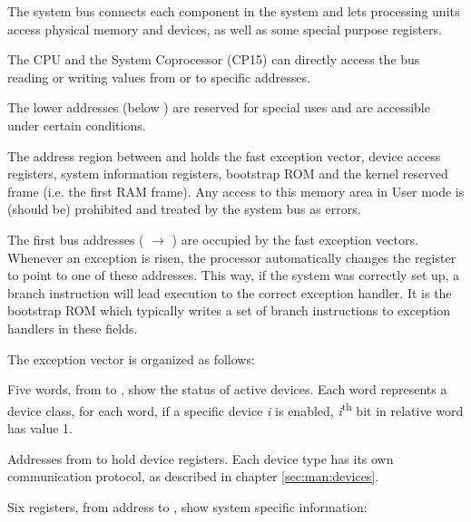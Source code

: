 
The system bus connects each component in the system and lets processing units access physical memory and devices, as well as some special purpose registers.

The CPU and the System Coprocessor (CP15) can directly access the bus reading or writing values from or to specific addresses.

The lower addresses (below ) are reserved for special uses and are accessible under certain conditions.

\label{sec:man:reservedAddressSpace}
The address region between  and  holds the fast exception vector, device access registers, system information registers, bootstrap ROM and the kernel reserved frame (i.e. the first RAM frame). Any access to this memory area in User mode is (should be) prohibited and treated by the system bus as errors.


\label{sec:man:exceptionVector}
The first bus addresses ( $\rightarrow$ ) are occupied by the fast exception vectors.
Whenever an exception is risen, the processor automatically changes the  register to point to one of these addresses. 
This way, if the system was correctly set up, a branch instruction will lead execution to the correct exception handler.
It is the bootstrap ROM which typically writes a set of branch instructions to exception handlers in these fields.

The exception vector is organized as follows:


Five words, from  to , show the status of active devices. Each word represents a device class, for each word, if a specific device \emph{i} is enabled, \emph{i}\textsuperscript{th} bit in relative word has value 1.


Addresses from  to  hold device registers.
Each device type has its own communication protocol, as described in chapter \ref{sec:man:devices}.

\label{sec:man:systemInformationRegisters}
Six registers, from address  to , show system specific information:

